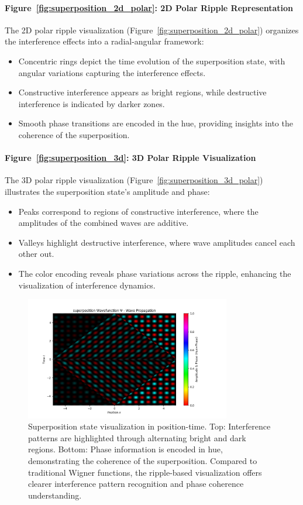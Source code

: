 \documentclass[12pt]{article}
\begin{document}
\paragraph{Figure~\ref{fig:superposition_2d_polar}: 2D Polar Ripple Representation}
The 2D polar ripple visualization (Figure~\ref{fig:superposition_2d_polar}) organizes the interference effects into a radial-angular framework:
\begin{itemize}
    \item Concentric rings depict the time evolution of the superposition state, with angular variations capturing the interference effects.
    \item Constructive interference appears as bright regions, while destructive interference is indicated by darker zones.
    \item Smooth phase transitions are encoded in the hue, providing insights into the coherence of the superposition.
\end{itemize}

\paragraph{Figure~\ref{fig:superposition_3d}: 3D Polar Ripple Visualization}
The 3D polar ripple visualization (Figure~\ref{fig:superposition_3d_polar}) illustrates the superposition state’s amplitude and phase:
\begin{itemize}
    \item Peaks correspond to regions of constructive interference, where the amplitudes of the combined waves are additive.
    \item Valleys highlight destructive interference, where wave amplitudes cancel each other out.
    \item The color encoding reveals phase variations across the ripple, enhancing the visualization of interference dynamics.
\end{itemize}

\begin{figure}[H]
\centering
\includegraphics[width=0.8\textwidth]{images/superposition_wavefunction_probability_density_with_phase.png}
\caption{Superposition state visualization in position-time. Top: Interference patterns are highlighted through alternating bright and dark regions. Bottom: Phase information is encoded in hue, demonstrating the coherence of the superposition. Compared to traditional Wigner functions, the ripple-based visualization offers clearer interference pattern recognition and phase coherence understanding.}
\label{fig:superposition}
\end{figure}
\end{document}
